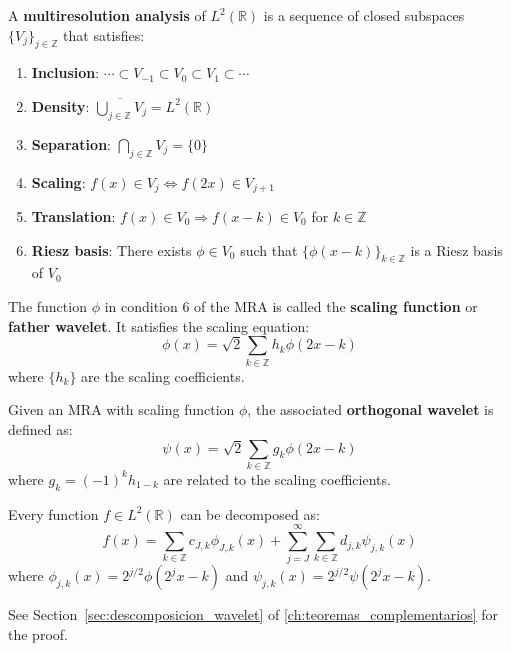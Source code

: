 \begin{definition}\label{def:mra}
A \textbf{multiresolution analysis} of $L^2(\mathbb{R})$ is a sequence of closed subspaces $\{V_j\}_{j \in \mathbb{Z}}$ that satisfies:
\begin{enumerate}
    \item \textbf{Inclusion}: $\cdots \subset V_{-1} \subset V_0 \subset V_1 \subset \cdots$
    \item \textbf{Density}: $\overline{\bigcup_{j \in \mathbb{Z}} V_j} = L^2(\mathbb{R})$
    \item \textbf{Separation}: $\bigcap_{j \in \mathbb{Z}} V_j = \{0\}$
    \item \textbf{Scaling}: $f(x) \in V_j \Leftrightarrow f(2x) \in V_{j+1}$
    \item \textbf{Translation}: $f(x) \in V_0 \Rightarrow f(x-k) \in V_0$ for $k \in \mathbb{Z}$
    \item \textbf{Riesz basis}: There exists $\phi \in V_0$ such that $\{\phi(x-k)\}_{k \in \mathbb{Z}}$ is a Riesz basis of $V_0$
\end{enumerate}
\end{definition}

\begin{definition}\label{def:funcion_escala}
The function $\phi$ in condition 6 of the MRA is called the \textbf{scaling function} or \textbf{father wavelet}. It satisfies the scaling equation:
\begin{equation}
\phi(x) = \sqrt{2} \sum_{k \in \mathbb{Z}} h_k \phi(2x - k)
\end{equation}
where $\{h_k\}$ are the scaling coefficients.
\end{definition}

\begin{definition}\label{def:wavelet_ortogonal}
Given an MRA with scaling function $\phi$, the associated \textbf{orthogonal wavelet} is defined as:
\begin{equation}
\psi(x) = \sqrt{2} \sum_{k \in \mathbb{Z}} g_k \phi(2x - k)
\end{equation}
where $g_k = (-1)^k h_{1-k}$ are related to the scaling coefficients.
\end{definition}

\begin{theorem}\label{thm:descomposicion_wavelet}
Every function $f \in L^2(\mathbb{R})$ can be decomposed as:
\begin{equation}
f(x) = \sum_{k \in \mathbb{Z}} c_{J,k} \phi_{J,k}(x) + \sum_{j=J}^{\infty} \sum_{k \in \mathbb{Z}} d_{j,k} \psi_{j,k}(x)
\end{equation}
where $\phi_{j,k}(x) = 2^{j/2} \phi(2^j x - k)$ and $\psi_{j,k}(x) = 2^{j/2} \psi(2^j x - k)$.

See Section~\ref{sec:descomposicion_wavelet} of \autoref{ch:teoremas_complementarios} for the proof.
\end{theorem}


